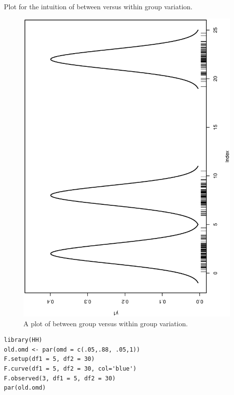 \documentclass[captions=tableheading]{scrbook}
\begin{document}
Plot for the intuition of between versus within group variation.








\begin{figure}[th]
  \includegraphics[angle=270, totalheight=4in]{ps/Between-versus-within.ps}
  \caption[Between group versus within group variation]{A plot of between group versus within group variation.}
  \label{fig:Between-versus-within}
\end{figure}


\begin{verbatim}
library(HH)
old.omd <- par(omd = c(.05,.88, .05,1))
F.setup(df1 = 5, df2 = 30)
F.curve(df1 = 5, df2 = 30, col='blue')
F.observed(3, df1 = 5, df2 = 30)
par(old.omd)
\end{verbatim}
\end{document}
